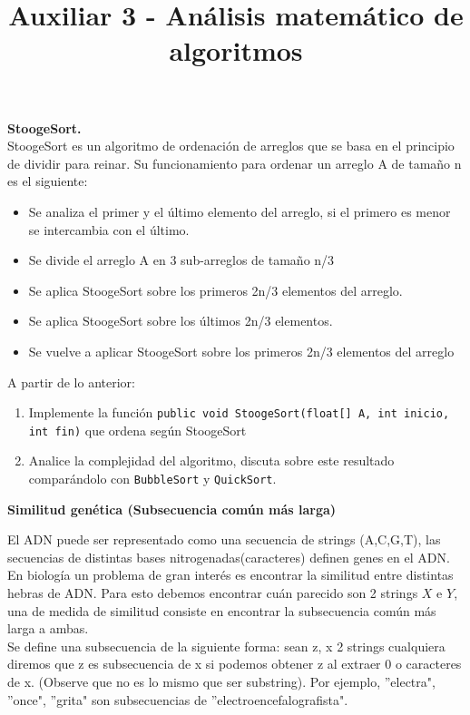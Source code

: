\documentclass[dcc]{fcfmcourse}
\title{Auxiliar 3 - Análisis matemático de algoritmos}
\begin{document}
\maketitle

\vspace{-1ex}

\begin{problems}
\problem \textbf{StoogeSort.}\\
StoogeSort es un algoritmo de ordenación de arreglos que se basa en el principio de dividir para reinar. Su funcionamiento para ordenar un arreglo A de tamaño n es el siguiente: 

\begin{itemize}
    \item Se analiza el primer y el último elemento del arreglo, si el primero es menor se intercambia con el último.
    \item Se divide el arreglo A en 3 sub-arreglos de tamaño n/3
    \item Se aplica StoogeSort sobre los primeros 2n/3 elementos del arreglo.
    \item Se aplica StoogeSort sobre los últimos 2n/3 elementos.
    \item Se vuelve a aplicar StoogeSort sobre los primeros 2n/3 elementos del arreglo
\end{itemize}

A partir de lo anterior:

\begin{enumerate}
    \item Implemente la función \texttt{public void StoogeSort(float[] A, int inicio, int fin)} que ordena según StoogeSort
    \item Analice la complejidad del algoritmo, discuta sobre este resultado comparándolo con \texttt{BubbleSort} y \texttt{QuickSort}.
\end{enumerate}

\problem \textbf{Similitud genética (Subsecuencia común más larga)}

El ADN puede ser representado como una secuencia de strings (A,C,G,T), las secuencias de distintas bases nitrogenadas(caracteres) definen genes en el ADN. En biología un problema de gran interés es encontrar la similitud entre distintas hebras de ADN. Para esto debemos encontrar cuán parecido son 2 strings $X$ e $Y$, una de medida de similitud consiste en encontrar la subsecuencia común más larga a ambas. \\

Se define una subsecuencia de la siguiente forma: sean z, x 2 strings cualquiera diremos que z es subsecuencia de x si podemos obtener z al extraer 0 o caracteres de x. (Observe que no es lo mismo que ser substring). Por ejemplo, ''electra", ''once", ''grita" son subsecuencias de ''electroencefalografista".\\


\end{problems}
\end{document}
